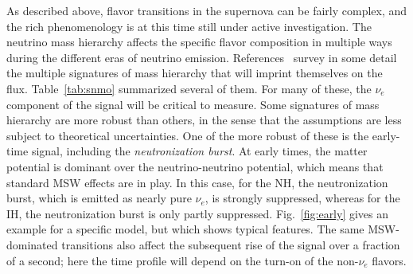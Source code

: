 As described above, flavor transitions
in the supernova can be fairly complex, and the rich phenomenology is
at this time still under active investigation.  The neutrino mass
hierarchy affects the specific flavor composition in multiple ways
during the different eras of neutrino emission.  
References~\cite{Mirizzi:2015eza,Scholberg:2017czd} survey in some detail the
multiple signatures of mass hierarchy that will imprint themselves on
the flux.  Table~\ref{tab:snmo} summarized several of them. For many of these, the $\nu_e$ component of the signal will
be critical to measure.    Some signatures of mass hierarchy are more robust than
others, in the sense that the assumptions are less subject to
theoretical uncertainties.  One of the more robust of these is the
early-time signal, including the \textit{neutronization burst}.   At
early times, the matter potential is dominant over the
neutrino-neutrino potential, which means that standard MSW effects are
in play.  In this case, for the NH, the neutronization burst, which is
emitted as nearly pure $\nu_e$, is strongly suppressed, whereas for
the IH, the neutronization burst is only partly suppressed.  
Fig.~\ref{fig:early} gives an example for a specific model, but which
shows typical features.  The same MSW-dominated transitions also
affect
the subsequent rise of the signal over a fraction of a second; here
the time profile will depend on the turn-on of the non-$\nu_e$ flavors.

